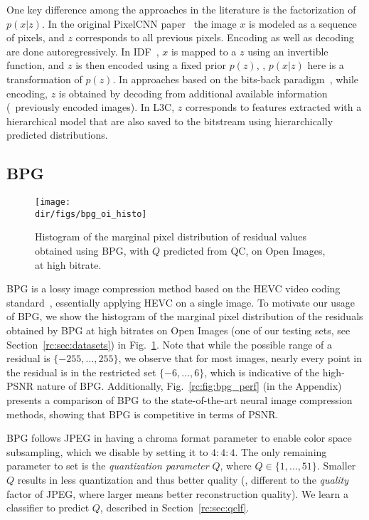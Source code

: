 One key difference among the approaches in the literature is the factorization
of $p(x|z)$. In the original PixelCNN paper~\cite{van2016conditional} the image
$x$ is modeled as a sequence of pixels, and $z$ corresponds to all previous
pixels. Encoding as well as decoding are done autoregressively. In
IDF~\cite{hoogeboom2019integer}, $x$ is mapped to a $z$ using an invertible
function, and $z$ is then encoded using a fixed prior $p(z)$, \ie, $p(x|z)$
here is a transformation of $p(z)$.  In approaches based on the bits-back
paradigm~\cite{townsend2019practical,kingma2019bit}, while encoding, $z$ is
obtained by  decoding from additional available information (\eg\ previously
encoded images).  In L3C, $z$ corresponds to features
extracted with
a hierarchical model that are also saved to the bitstream using hierarchically
predicted distributions.

\subsection{BPG}
\label{rc:sec:bpg}

\begin{figure}
\centering
\texttt{[image: \\dir/figs/bpg\_oi\_histo]}
    \caption{\label{rc:fig:bpg_histo}Histogram of the marginal pixel distribution of residual values obtained using BPG, with $Q$ predicted from QC, on Open Images, at high bitrate.}
\end{figure}

BPG is a lossy image compression method based on the HEVC video coding
standard~\cite{sullivan2012overview}, essentially applying HEVC on a single
image.  To motivate our usage of BPG, we show the histogram of the marginal
pixel distribution of the residuals obtained by BPG at high bitrates on Open Images (one of our
testing sets, see Section~\ref{rc:sec:datasets}) in
Fig.~\ref{rc:fig:bpg_histo}.  Note that while the possible range of a residual
is $\{-255, \dots, 255\}$, we observe that for most images, nearly every point
in the residual is in the restricted set $\{-6, \dots, 6\}$, which is
indicative of the high-PSNR nature of BPG.  Additionally,
Fig.~\ref{rc:fig:bpg_perf} (in the Appendix) presents a comparison of BPG to the
state-of-the-art neural image compression methods, showing that BPG is 
competitive in terms of PSNR.

BPG follows JPEG in having a chroma format parameter to enable color space
subsampling, which we disable by setting it to $4{:}4{:}4$.  The only remaining
parameter to set is the \emph{quantization parameter} $Q$, where $Q \in \{1,
\dots, 51\}$. Smaller $Q$ results in less quantization and thus better quality
(\ie, different to the \emph{quality} factor of JPEG, where larger means
better reconstruction quality). We learn a classifier to predict $Q$, described
in Section~\ref{rc:sec:qclf}.

